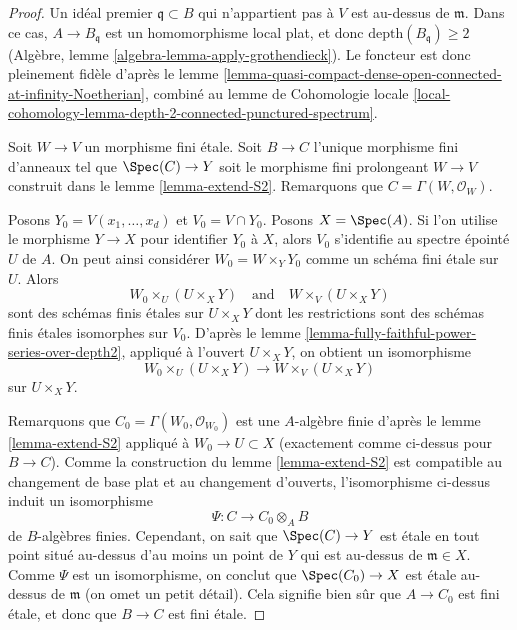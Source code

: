 \begin{proof}
Un idéal premier $\mathfrak q \subset B$ qui n'appartient pas à $V$
est au-dessus de $\mathfrak m$. Dans ce cas, $A \to B_\mathfrak q$
est un homomorphisme local plat, et donc $\text{depth}(B_\mathfrak q) \geq 2$
(Algèbre, lemme \ref{algebra-lemma-apply-grothendieck}).
Le foncteur est donc pleinement fidèle d'après le
lemme \ref{lemma-quasi-compact-dense-open-connected-at-infinity-Noetherian},
combiné au lemme de Cohomologie locale
\ref{local-cohomology-lemma-depth-2-connected-punctured-spectrum}.

\medskip\noindent
Soit $W \to V$ un morphisme fini étale. Soit $B \to C$ l'unique morphisme fini
d'anneaux tel que $\Spec(C) \to Y$ soit le morphisme fini prolongeant
$W \to V$ construit dans le lemme \ref{lemma-extend-S2}.
Remarquons que $C = \Gamma(W, \mathcal{O}_W)$.

\medskip\noindent
Posons $Y_0 = V(x_1, \ldots, x_d)$ et $V_0 = V \cap Y_0$. Posons $X = \Spec(A)$.
Si l'on utilise le morphisme $Y \to X$ pour identifier $Y_0$ à $X$,
alors $V_0$ s'identifie au spectre épointé $U$ de $A$.
On peut ainsi considérer $W_0 = W \times_Y Y_0$ comme un schéma fini étale
sur $U$. Alors
$$
W_0 \times_U (U \times_X Y)
\quad\text{and}\quad
W \times_V (U \times_X Y)
$$
sont des schémas finis étales sur $U \times_X Y$ dont les restrictions sont
des schémas finis étales isomorphes sur $V_0$. D'après le
lemme \ref{lemma-fully-faithful-power-series-over-depth2},
appliqué à l'ouvert $U \times_X Y$, on obtient un isomorphisme
$$
W_0 \times_U (U \times_X Y) \longrightarrow W \times_V (U \times_X Y)
$$
sur $U \times_X Y$.

\medskip\noindent
Remarquons que $C_0 = \Gamma(W_0, \mathcal{O}_{W_0})$ est une $A$-algèbre finie
d'après le lemme \ref{lemma-extend-S2} appliqué à $W_0 \to U \subset X$ (exactement
comme ci-dessus pour $B \to C$). Comme la construction du
lemme \ref{lemma-extend-S2} est compatible au changement de base plat
et au changement d'ouverts, l'isomorphisme ci-dessus induit
un isomorphisme
$$
\Psi : C \longrightarrow C_0 \otimes_A B
$$
de $B$-algèbres finies. Cependant, on sait que $\Spec(C) \to Y$
est étale en tout point situé au-dessus d'au moins un point de $Y$ qui est
au-dessus de $\mathfrak m \in X$. Comme $\Psi$ est un isomorphisme, on
conclut que $\Spec(C_0) \to X$
est étale au-dessus de $\mathfrak m$ (on omet un petit détail).
Cela signifie bien sûr que $A \to C_0$ est fini
étale, et donc que $B \to C$ est fini étale.
\end{proof}

